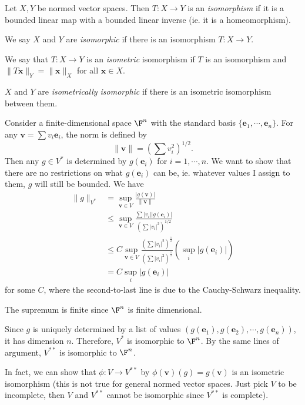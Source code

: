 \documentclass[a4paper]{article}
\begin{document}
\begin{defi}[Isomorphism]
  Let $X, Y$ be normed vector spaces. Then $T: X\to Y$ is an \emph{isomorphism} if it is a bounded linear map with a bounded linear inverse (ie. it is a homeomorphism).

  We say $X$ and $Y$ are \emph{isomorphic} if there is an isomorphism $T: X\to Y$.

  We say that $T: X\to Y$ is an \emph{isometric} isomorphism if $T$ is an isomorphism and $\|T\mathbf{x}\|_Y = \|\mathbf{x}\|_X$ for all $\mathbf{x}\in X$.

  $X$ and $Y$ are \emph{isometrically isomorphic} if there is an isometric isomorphism between them.
\end{defi}

\begin{eg}
  Consider a finite-dimensional space $\F^n$ with the standard basis $\{\mathbf{e}_1, \cdots, \mathbf{e}_n\}$. For any $\mathbf{v} = \sum v_i \mathbf{e}_i$, the norm is defined by
  \[
    \|\mathbf{v}\| = \left(\sum v_i^2\right)^{1/2}.
  \]
  Then any $g\in V^*$ is determined by $g(\mathbf{e}_i)$ for $i = 1, \cdots, n$. We want to show that there are no restrictions on what $g(\mathbf{e}_i)$ can be, ie. whatever values I assign to them, $g$ will still be bounded. We have
  \begin{align*}
    \|g\|_{V^*} &= \sup_{\mathbf{v}\in V}\frac{|g(\mathbf{v})|}{\|\mathbf{v}\|}\\
    &\leq \sup_{\mathbf{v}\in V}\frac{\sum |v_i||g(\mathbf{e}_i)|}{(\sum |v_i|^2)^{1/2}}\\
    &\leq C\sup_{\mathbf{v}\in V}\frac{(\sum |v_i|^2)^{\frac{1}{2}}}{(\sum|v_i|^2)^{\frac{1}{2}}}\left(\sup_i |g(\mathbf{e}_i)|\right)\\
    &= C\sup_i |g(\mathbf{e}_i)|
  \end{align*}
  for some $C$, where the second-to-last line is due to the Cauchy-Schwarz inequality.

  The supremum is finite since $\F^n$ is finite dimensional.

  Since $g$ is uniquely determined by a list of values $(g(\mathbf{e}_1), g(\mathbf{e}_2), \cdots, g(\mathbf{e}_n))$, it has dimension $n$. Therefore, $V^*$ is isomorphic to $\F^n$. By the same lines of argument, $V^{**}$ is isomorphic to $\F^n$.

  In fact, we can show that $\phi: V\to V^{**}$ by $\phi(\mathbf{v})(g) = g(\mathbf{v})$ is an isometric isomorphism (this is not true for general normed vector spaces. Just pick $V$ to be incomplete, then $V$ and $V^{**}$ cannot be isomorphic since $V^{**}$ is complete).
\end{eg}
\end{document}
